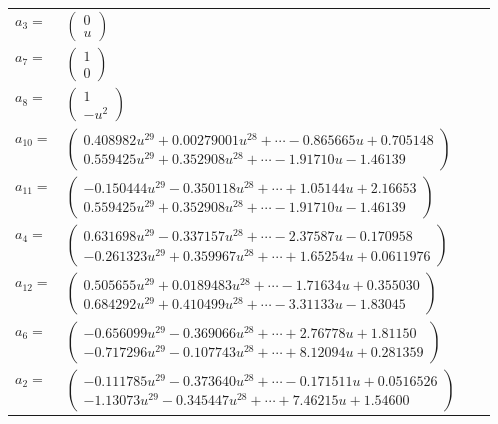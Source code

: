 \documentclass[1p]{elsarticle_modified}
\theoremstyle{definition}
\begin{document}
\begin{tabular}{m{7pt} m{180pt} m{7pt} m{180pt} }
\flushright $a_{3}=$&$\begin{pmatrix}0\\u\end{pmatrix}$ \\
\flushright $a_{7}=$&$\begin{pmatrix}1\\0\end{pmatrix}$ \\
\flushright $a_{8}=$&$\begin{pmatrix}1\\- u^2\end{pmatrix}$ \\
\flushright $a_{10}=$&$\begin{pmatrix}0.408982 u^{29}+0.00279001 u^{28}+\cdots-0.865665 u+0.705148\\0.559425 u^{29}+0.352908 u^{28}+\cdots-1.91710 u-1.46139\end{pmatrix}$ \\
\flushright $a_{11}=$&$\begin{pmatrix}-0.150444 u^{29}-0.350118 u^{28}+\cdots+1.05144 u+2.16653\\0.559425 u^{29}+0.352908 u^{28}+\cdots-1.91710 u-1.46139\end{pmatrix}$ \\
\flushright $a_{4}=$&$\begin{pmatrix}0.631698 u^{29}-0.337157 u^{28}+\cdots-2.37587 u-0.170958\\-0.261323 u^{29}+0.359967 u^{28}+\cdots+1.65254 u+0.0611976\end{pmatrix}$ \\
\flushright $a_{12}=$&$\begin{pmatrix}0.505655 u^{29}+0.0189483 u^{28}+\cdots-1.71634 u+0.355030\\0.684292 u^{29}+0.410499 u^{28}+\cdots-3.31133 u-1.83045\end{pmatrix}$ \\
\flushright $a_{6}=$&$\begin{pmatrix}-0.656099 u^{29}-0.369066 u^{28}+\cdots+2.76778 u+1.81150\\-0.717296 u^{29}-0.107743 u^{28}+\cdots+8.12094 u+0.281359\end{pmatrix}$ \\
\flushright $a_{2}=$&$\begin{pmatrix}-0.111785 u^{29}-0.373640 u^{28}+\cdots-0.171511 u+0.0516526\\-1.13073 u^{29}-0.345447 u^{28}+\cdots+7.46215 u+1.54600\end{pmatrix}$ \\

\end{tabular}
\end{document}
